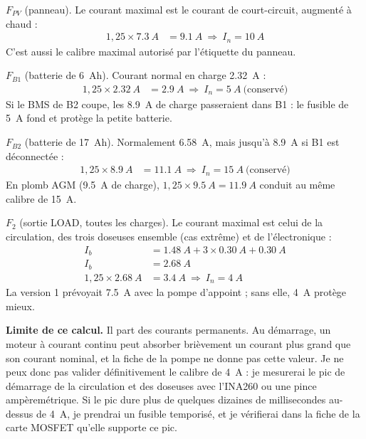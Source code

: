 \begin{demonstration}
$F_{PV}$ (panneau). Le courant maximal est le courant de court-circuit, augmenté à chaud :
\begin{align*}
1{,}25 \times \qty{7,3}{A} &= \qty{9,1}{A}\ \Rightarrow\ I_n = \qty{10}{A}
\end{align*}
C'est aussi le calibre maximal autorisé par l'étiquette du panneau.

$F_{B1}$ (batterie de \qty{6}{Ah}). Courant normal en charge \qty{2,32}{A} :
\begin{align*}
1{,}25 \times \qty{2,32}{A} &= \qty{2,9}{A}\ \Rightarrow\ I_n = \qty{5}{A}\ \text{(conservé)}
\end{align*}
Si le BMS de B2 coupe, les \qty{8,9}{A} de charge passeraient dans B1 : le fusible de \qty{5}{A} fond et protège la petite batterie.

$F_{B2}$ (batterie de \qty{17}{Ah}). Normalement \qty{6,58}{A}, mais jusqu'à \qty{8,9}{A} si B1 est déconnectée :
\begin{align*}
1{,}25 \times \qty{8,9}{A} &= \qty{11,1}{A}\ \Rightarrow\ I_n = \qty{15}{A}\ \text{(conservé)}
\end{align*}
En plomb AGM (\qty{9,5}{A} de charge), $1{,}25 \times \qty{9,5}{A} = \qty{11,9}{A}$ conduit au même calibre de \qty{15}{A}.

$F_2$ (sortie LOAD, toutes les charges). Le courant maximal est celui de la circulation, des trois doseuses ensemble (cas extrême) et de l'électronique :
\begin{align*}
I_b &= \qty{1,48}{A} + 3 \times \qty{0,30}{A} + \qty{0,30}{A}\\
I_b &= \qty{2,68}{A}\\
1{,}25 \times \qty{2,68}{A} &= \qty{3,4}{A}\ \Rightarrow\ I_n = \qty{4}{A}
\end{align*}
La version 1 prévoyait \qty{7,5}{A} avec la pompe d'appoint ; sans elle, \qty{4}{A} protège mieux.

\textbf{Limite de ce calcul.} Il part des courants permanents. Au démarrage, un moteur à courant continu peut absorber brièvement un courant plus grand que son courant nominal, et la fiche de la pompe ne donne pas cette valeur. Je ne peux donc pas valider définitivement le calibre de \qty{4}{A} : je mesurerai le pic de démarrage de la circulation et des doseuses avec l'INA260 ou une pince ampèremétrique. Si le pic dure plus de quelques dizaines de millisecondes au-dessus de \qty{4}{A}, je prendrai un fusible temporisé, et je vérifierai dans la fiche de la carte MOSFET qu'elle supporte ce pic.


\end{demonstration}
